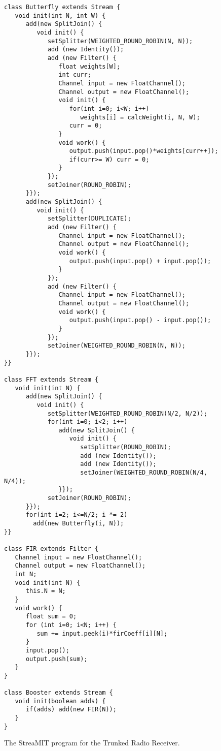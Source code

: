 \begin{figure}[t]
\scriptsize
\begin{verbatim}
class Butterfly extends Stream {
   void init(int N, int W) {
      add(new SplitJoin() {
         void init() {
            setSplitter(WEIGHTED_ROUND_ROBIN(N, N));
            add (new Identity());
            add (new Filter() {
               float weights[W];
               int curr;
               Channel input = new FloatChannel();
               Channel output = new FloatChannel();
               void init() {
                  for(int i=0; i<W; i++)
                     weights[i] = calcWeight(i, N, W);
                  curr = 0;
               }
               void work() {
                  output.push(input.pop()*weights[curr++]);
                  if(curr>= W) curr = 0;
               }    
            });
            setJoiner(ROUND_ROBIN);
      }});
      add(new SplitJoin() {
         void init() {
            setSplitter(DUPLICATE);
            add (new Filter() {   
               Channel input = new FloatChannel();
               Channel output = new FloatChannel();
               void work() {
                  output.push(input.pop() + input.pop());
               }
            });
            add (new Filter() {   
               Channel input = new FloatChannel();
               Channel output = new FloatChannel();
               void work() {
                  output.push(input.pop() - input.pop());
               }
            });
            setJoiner(WEIGHTED_ROUND_ROBIN(N, N));
      }});
}}

class FFT extends Stream {
   void init(int N) {
      add(new SplitJoin() {
         void init() {
            setSplitter(WEIGHTED_ROUND_ROBIN(N/2, N/2));
            for(int i=0; i<2; i++) 
               add(new SplitJoin() {
                  void init() {
                     setSplitter(ROUND_ROBIN);
                     add (new Identity());
                     add (new Identity());
                     setJoiner(WEIGHTED_ROUND_ROBIN(N/4, N/4));
               }});
            setJoiner(ROUND_ROBIN);
      }});
      for(int i=2; i<=N/2; i *= 2)
        add(new Butterfly(i, N));
}}

class FIR extends Filter {
   Channel input = new FloatChannel();
   Channel output = new FloatChannel();           
   int N;
   void init(int N) {
      this.N = N;
   }
   void work() {
      float sum = 0;
      for (int i=0; i<N; i++) {
         sum += input.peek(i)*firCoeff[i][N];
      }
      input.pop();
      output.push(sum);
   }
}

class Booster extends Stream {
   void init(boolean adds) {
      if(adds) add(new FIR(N));
   }
}
\end{verbatim}
\vspace{-12pt}
\caption{\protect\small The StreaMIT program for the Trunked Radio Receiver.
\protect\label{fig:radiocode}}
\vspace{-12pt}
\end{figure}

